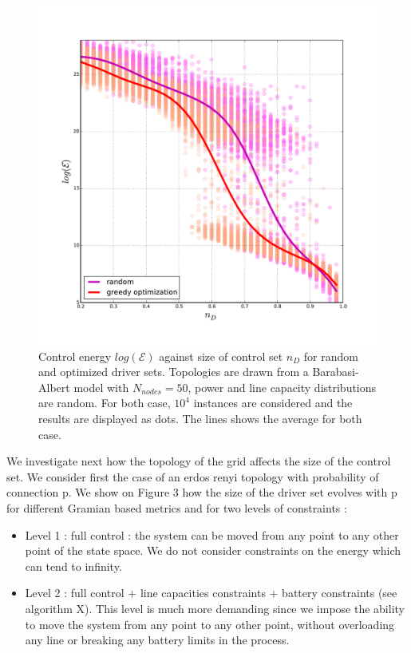 \documentclass[conference]{IEEEtran}
\begin{document}
\begin{figure}
\label{fig:densities}
\includegraphics[scale=.35]{energy}
\caption{Control energy $log(\mathcal{E})$ against size of control set $n_D$ for random and optimized driver sets. Topologies are drawn from a Barabasi-Albert model with $ N_{nodes} = 50 $, power and line capacity distributions are random. For both case, $10^4$ instances are considered and the results are displayed as dots. The lines shows the average for both case. }
\end{figure}

We investigate next how the topology of the grid affects the size of the control set. We consider first the case of an erdos renyi topology with probability of connection p. We show on Figure 3 how the size of the driver set evolves with p for different Gramian based metrics and for two levels of constraints : 

\begin{itemize}
\item Level 1 : full control : the system can be moved from any point to any other point of the state space. We do not consider constraints on the energy which can tend to infinity. 
\item Level 2 : full control + line capacities constraints + battery constraints (see algorithm X). This level is much more demanding since we impose the ability to move the system from any point to any other point, without overloading any line or breaking any battery limits in the process.
\end{itemize}
\end{document}
